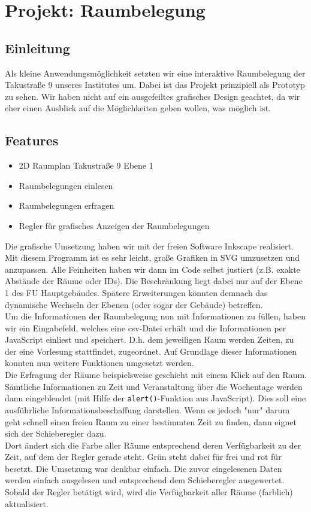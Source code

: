 \section{Projekt: Raumbelegung}

\subsection{Einleitung}
Als kleine Anwendungsmöglichkeit setzten wir eine interaktive Raumbelegung der Takustraße 9 unseres Institutes um. Dabei ist das Projekt prinzipiell als Prototyp zu sehen. Wir haben nicht auf ein ausgefeiltes grafisches Design geachtet, da wir eher einen Ausblick auf die Möglichkeiten geben wollen, was möglich ist.

\subsection{Features}
\begin{itemize}
	\item 2D Raumplan Takustraße 9 Ebene 1
	\item Raumbelegungen einlesen
	\item Raumbelegungen erfragen
	\item Regler für grafisches Anzeigen der Raumbelegungen
\end{itemize}

Die grafische Umsetzung haben wir mit der freien Software Inkscape \cite{inkscape} realisiert. Mit diesem Programm ist es sehr leicht, große Grafiken in SVG umzusetzen und anzupassen. Alle Feinheiten haben wir dann im Code selbst justiert (z.B. exakte Abstände der Räume oder IDs). Die Beschränkung liegt dabei nur auf der Ebene 1 des FU Hauptgebäudes. Spätere Erweiterungen könnten demnach das dynamische Wechseln der Ebenen (oder sogar der Gebäude) betreffen.\\

Um die Informationen der Raumbelegung nun mit Informationen zu füllen, haben wir ein Eingabefeld, welches eine csv-Datei erhält und die Informationen per JavaScript einliest und speichert. D.h. dem jeweiligen Raum werden Zeiten, zu der eine Vorlesung stattfindet, zugeordnet. Auf Grundlage dieser Informationen konnten nun weitere Funktionen umgesetzt werden.\\

Die Erfragung der Räume beispielsweise geschieht mit einem Klick auf den Raum. Sämtliche Informationen zu Zeit und Veranstaltung über die Wochentage werden dann eingeblendet (mit Hilfe der \texttt{alert()}-Funktion aus JavaScript). Dies soll eine ausführliche Informationsbeschaffung darstellen. Wenn es jedoch "nur" darum geht schnell einen freien Raum zu einer bestimmten Zeit zu finden, dann eignet sich der Schieberegler dazu.\\
Dort ändert sich die Farbe aller Räume entsprechend deren Verfügbarkeit zu der Zeit, auf dem der Regler gerade steht. Grün steht dabei für frei und rot für besetzt. Die Umsetzung war denkbar einfach. Die zuvor eingelesenen Daten werden einfach ausgelesen und entsprechend dem Schieberegler ausgewertet. Sobald der Regler betätigt wird, wird die Verfügbarkeit aller Räume (farblich) aktualisiert.

\newpage
